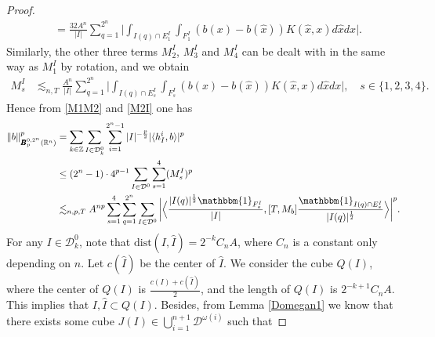 \documentclass[oneside,english,a4wide]{amsart}
\numberwithin{equation}{section}
\numberwithin{figure}{section}
\theoremstyle{plain}
\theoremstyle{plain}
\theoremstyle{definition}
\theoremstyle{plain}
\theoremstyle{remark}
\theoremstyle{definition}
\theoremstyle{remark}
\theoremstyle{definition}
\newcommand{\8}{\infty}
\begin{document}
\begin{proof}
\begin{equation*}
\begin{aligned}
			&=\frac{32A^n}{|I|}\sum_{q=1}^{2^n}\bigg|\int_{I(q)\cap E_1^I}\int_{F_1^I} (b(x)-b(\hat{x}))K(\hat{x},x)d\hat{x}dx\bigg|.
		\end{aligned}
	\end{equation*}
Similarly, the other three terms $M_2^I$, $M_3^I$ and $M_4^I$ can be dealt with in the same way as $M_1^I$ by rotation, and we obtain
	\begin{equation}\label{M2I}
		\begin{aligned}
			M_s^I{}&
			\lesssim_{n,T} \frac{A^n}{|I|}\sum_{q=1}^{2^n}\bigg|\int_{I(q)\cap E_s^I}\int_{F_s^I} (b(x)-b(\hat{x}))K(\hat{x},x)d\hat{x}dx\bigg|,\quad s\in\{1,2,3,4\}.
		\end{aligned}
	\end{equation}
	Hence from \eqref{M1M2} and \eqref{M2I} one has
	\begin{equation}\label{second2}
		\begin{aligned}
			\|b\|^p_{\pmb{B}_p^{0,2^n}(\mathbb{R}^n)}{}
			&= \sum_{k\in\mathbb{Z}}\sum_{I\in\mathcal{D}^0_k}\sum_{i=1}^{2^n-1} |I|^{-\frac{p}{2}} |\langle h_I^i,b\rangle|^p\\
			&\le (2^n-1) \cdot 4^{p-1} \sum_{I\in\mathcal{D}^0}\sum_{s=1}^4 (M_s^I)^p\\
			&\lesssim_{n,p,T} A^{np}\sum_{s=1}^4\sum_{q=1}^{2^n}\sum_{I\in\mathcal{D}^0}\bigg|\Big\langle \frac{|I(q)|^{\frac{1}{2}}\mathbbm{1}_{F_s^I}}{|I|}, [T,M_b]\frac{\mathbbm{1}_{I(q)\cap E_s^I}}{|I(q)|^{\frac{1}{2}}}\Big\rangle\bigg|^p.
		\end{aligned}
	\end{equation}
	For any $I\in\mathcal{D}^0_k$, note that $\mathrm{dist}(I,\hat{I})=2^{-k}C_nA$, where $C_n$ is a constant only depending on $n$. Let $c(\hat{I})$ be the center of $\hat{I}$. We consider the cube $Q(I)$, where the center of $Q(I)$ is $\frac{c(I)+c(\hat{I})}{2}$, and the length of $Q(I)$ is $2^{-k+1}C_nA$. This implies that $I,\hat{I}\subset Q(I)$. Besides, from Lemma \ref{Domegan1} we know that there exists some cube $J(I)\in\bigcup\limits_{i=1}^{n+1} \mathcal{D}^{\omega(i)}$ such that

\end{proof}
\end{document}
